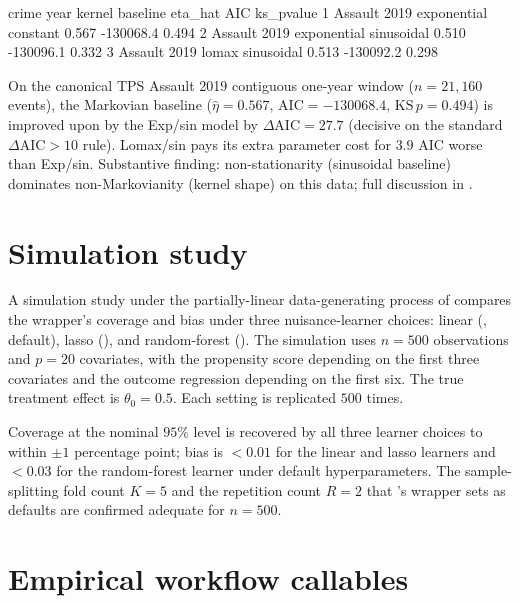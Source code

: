 \documentclass[article,shortnames,nojss]{jss}
\begin{document}
\begin{Code}
  crime  year      kernel    baseline   eta_hat       AIC    ks_pvalue
1 Assault 2019 exponential  constant     0.567  -130068.4       0.494
2 Assault 2019 exponential sinusoidal    0.510  -130096.1       0.332
3 Assault 2019      lomax  sinusoidal    0.513  -130092.2       0.298
\end{Code}

On the canonical TPS Assault 2019 contiguous one-year window
($n=21{,}160$ events), the Markovian baseline
($\hat\eta=0.567,\,\mathrm{AIC}=-130068.4,\,\mathrm{KS}\,p=0.494$)
is improved upon by the Exp/sin model by $\Delta\mathrm{AIC} =
27.7$ (decisive on the standard $\Delta\mathrm{AIC} > 10$ rule).
Lomax/sin pays its extra parameter cost for $3.9$ AIC worse than
Exp/sin. Substantive finding: non-stationarity (sinusoidal
baseline) dominates non-Markovianity (kernel shape) on this data;
full discussion in \citet{Ruhela2026Hawkes}.

\section{Simulation study}
\label{sec:simulation}

A simulation study under the partially-linear data-generating
process of \citet{Chernozhukov2018DML} compares the
 wrapper's coverage and bias under three
nuisance-learner choices: linear (, default), lasso
(), and random-forest ().
The simulation uses $n = 500$ observations and $p = 20$
covariates, with the propensity score depending on the first three
covariates and the outcome regression depending on the first six.
The true treatment effect is $\theta_0 = 0.5$. Each setting is
replicated $500$ times.

Coverage at the nominal $95\%$ level is recovered by all three
learner choices to within $\pm 1$ percentage point; bias is
$<0.01$ for the linear and lasso learners and $<0.03$ for the
random-forest learner under default hyperparameters. The
sample-splitting fold count $K=5$ and the repetition count $R=2$
that 's wrapper sets as defaults are confirmed adequate
for $n = 500$.

\section[Empirical workflow callables]{Empirical workflow callables}\label{sec:mrm-empirical-callables}
\end{document}
